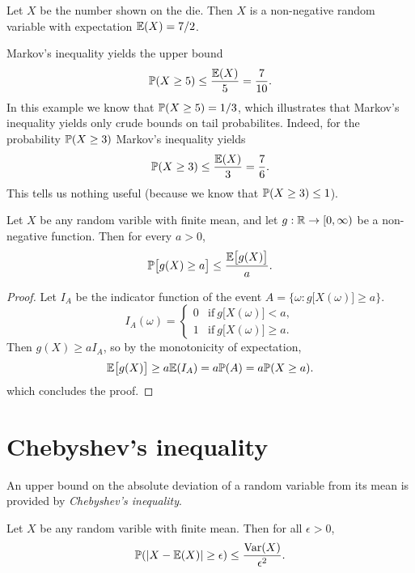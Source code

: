 \begin{solution}
Let $X$ be the number shown on the die. Then $X$ is a non-negative random variable with expectation $\mathbb{E}(X) = 7/2$.

Markov's inequality yields the upper bound 
\[
\mathbb{P}(X\geq 5) \leq \frac{\mathbb{E}(X)}{5} = \frac{7}{10}.
\]
In this example we know that $\mathbb{P}(X\geq 5)=1/3$, which illustrates that Markov's inequality yields only crude bounds on tail probabilites. Indeed, for the probability $\mathbb{P}(X\geq 3)$ Markov's inequality yields
\[
\mathbb{P}(X\geq 3) \leq \frac{\mathbb{E}(X)}{3} = \frac{7}{6}.
\]
This tells us nothing useful (because we know that $\mathbb{P}(X\geq 3)\leq 1$). 
\end{solution}

\begin{theorem}
Let $X$ be any random varible with finite mean, and let $g:\mathbb{R}\to[0,\infty)$ be a non-negative function. Then for every $a>0$,
\[
\mathbb{P}\big[g(X)\geq a\big] \leq \frac{\mathbb{E}\big[g(X)\big]}{a}.
\]
\end{theorem}

\begin{proof}
Let $I_A$ be the indicator function of the event $A = \big\{\omega: g\big[X(\omega)\big]\geq a\big\}$. 
\[
I_A(\omega) = \left\{\begin{array}{ll} 0 & \text{if}\ g\big[X(\omega)\big] < a, \\ 1 & \text{if}\ g\big[X(\omega)\big]\geq a. \end{array}\right.
\]
Then $g(X)\geq a I_A$, so by the monotonicity of expectation,
\[
\mathbb{E}\big[g(X)\big] \geq a\mathbb{E}(I_A) = a\mathbb{P}(A) = a\mathbb{P}(X\geq a).
\]
which concludes the proof.
\end{proof}

\section{Chebyshev's inequality}

An upper bound on the absolute deviation of a random variable from its mean is provided by \emph{Chebyshev's inequality}.

\begin{corollary}
Let $X$ be any random varible with finite mean. Then for all $\epsilon>0$,
\[
\mathbb{P}(|X-\mathbb{E}(X)|\geq \epsilon) \leq \frac{\text{Var}(X)}{\epsilon^2}.
\]
\end{corollary}

